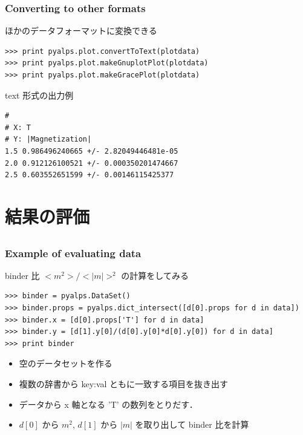 \begin{frame}[t,fragile]
\frametitle{Converting to other formats}
ほかのデータフォーマットに変換できる
\begin{lstlisting}
>>> print pyalps.plot.convertToText(plotdata)
>>> print pyalps.plot.makeGnuplotPlot(plotdata)
>>> print pyalps.plot.makeGracePlot(plotdata)
\end{lstlisting}

text 形式の出力例
\begin{lstlisting}
# 
# X: T
# Y: |Magnetization|
1.5	0.986496240665 +/- 2.82049446481e-05
2.0	0.912126100521 +/- 0.000350201474667
2.5	0.603552651599 +/- 0.00146115425377
\end{lstlisting}

\end{frame}

\section{結果の評価}
\subsection*{\redm\whiteb\greenb}

\begin{frame}[t,fragile]
\frametitle{Example of evaluating data}
binder 比 $<m^2>/<|m|>^2$ の計算をしてみる
\begin{lstlisting}
>>> binder = pyalps.DataSet()
>>> binder.props = pyalps.dict_intersect([d[0].props for d in data])
>>> binder.x = [d[0].props['T'] for d in data]
>>> binder.y = [d[1].y[0]/(d[0].y[0]*d[0].y[0]) for d in data]
>>> print binder
\end{lstlisting}
\begin{itemize}
\item 空のデータセットを作る
\item 複数の辞書から key:val ともに一致する項目を抜き出す
\item データから x 軸となる 'T' の数列をとりだす．
\item $d[0]$ から $m^2$, $d[1]$ から $|m|$ を取り出して binder 比を計算
\end{itemize}
\end{frame}


